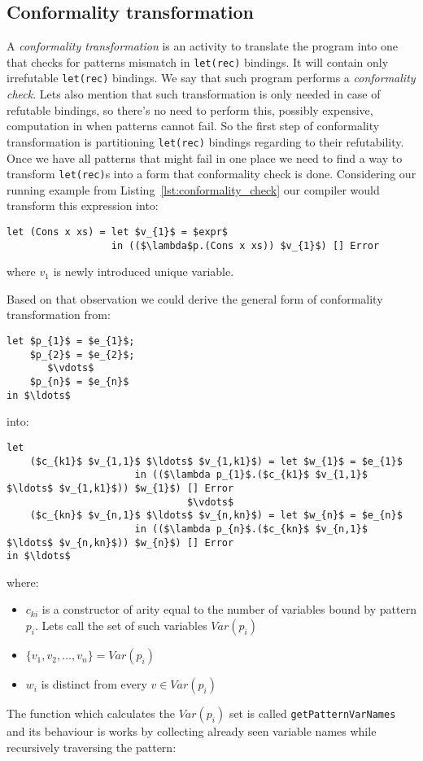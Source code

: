 \documentclass[a4paper]{report}
\begin{document}
\subsection{Conformality transformation}
\label{sec:conformality_transformation}
A \textit{conformality transformation} is an activity to translate the program
into one that checks for patterns mismatch in \texttt{let(rec)} bindings. It
will contain only irrefutable \texttt{let(rec)} bindings. We say that such
program performs a \textit{conformality check}. Lets also mention that such
transformation is only needed in case of refutable bindings, so there's no need
to perform this, possibly expensive, computation in when patterns cannot fail.
So the first step of conformality transformation is partitioning
\texttt{let(rec)} bindings regarding to their refutability. Once we have all
patterns that might fail in one place we need to find a way to transform
\texttt{let(rec)}s into a form that conformality check is done.  Considering
our running example from Listing~\ref{lst:conformality_check} our compiler
would transform this expression into:
\begin{lstlisting}[mathescape=true]
let (Cons x xs) = let $v_{1}$ = $expr$
                  in (($\lambda$p.(Cons x xs)) $v_{1}$) [] Error
\end{lstlisting}
where $v_{1}$ is newly introduced unique variable.

Based on that observation we could derive the general form of conformality
transformation from:
\begin{lstlisting}[mathescape=true]
let $p_{1}$ = $e_{1}$;
    $p_{2}$ = $e_{2}$;
       $\vdots$
    $p_{n}$ = $e_{n}$
in $\ldots$
\end{lstlisting}
into:
\begin{lstlisting}[mathescape=true]
let
    ($c_{k1}$ $v_{1,1}$ $\ldots$ $v_{1,k1}$) = let $w_{1}$ = $e_{1}$
                      in (($\lambda p_{1}$.($c_{k1}$ $v_{1,1}$ $\ldots$ $v_{1,k1}$)) $w_{1}$) [] Error
                               $\vdots$
    ($c_{kn}$ $v_{n,1}$ $\ldots$ $v_{n,kn}$) = let $w_{n}$ = $e_{n}$
                      in (($\lambda p_{n}$.($c_{kn}$ $v_{n,1}$ $\ldots$ $v_{n,kn}$)) $w_{n}$) [] Error
in $\ldots$
\end{lstlisting}
where:
\begin{itemize}
  \item $c_{ki}$ is a constructor of arity equal to the number of variables
    bound by pattern $p_{i}$. Lets call the set of such variables $Var(p_{i})$
  \item $\{v_1, v_2, \ldots, v_n\} = Var(p_i)$
  \item $w_{i}$ is distinct from every $v \in Var(p_i)$
\end{itemize}
The function which calculates the $Var(p_i)$ set is called
\texttt{getPatternVarNames} and its behaviour is works by collecting already
seen variable names while recursively traversing the pattern:
\end{document}
